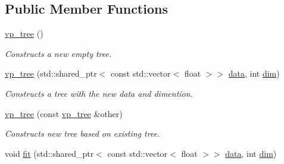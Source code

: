 \subsection*{Public Member Functions}
\begin{DoxyCompactItemize}
\item 
\hypertarget{classtree_1_1vp__tree_a268b595d9493cf220176cda4f7dccca2}{}\hyperlink{classtree_1_1vp__tree_a268b595d9493cf220176cda4f7dccca2}{vp\+\_\+tree} ()\label{classtree_1_1vp__tree_a268b595d9493cf220176cda4f7dccca2}

\begin{DoxyCompactList}\small\item\em Constructs a new empty tree. \end{DoxyCompactList}\item 
\hypertarget{classtree_1_1vp__tree_a40549e3c3fde384b2cbdb96485301161}{}\hyperlink{classtree_1_1vp__tree_a40549e3c3fde384b2cbdb96485301161}{vp\+\_\+tree} (std\+::shared\+\_\+ptr$<$ const std\+::vector$<$ float $>$$>$ \hyperlink{classtree_1_1vp__tree_a0ac835729832f805cfde6375891f9073}{data}, int \hyperlink{classtree_1_1vp__tree_a9654dfc1b8ec7db0718f3d98a9efe5e1}{dim})\label{classtree_1_1vp__tree_a40549e3c3fde384b2cbdb96485301161}

\begin{DoxyCompactList}\small\item\em Constructs a tree with the new data and dimention. \end{DoxyCompactList}\item 
\hypertarget{classtree_1_1vp__tree_a98910f15d4574987845e36962bb64f03}{}\hyperlink{classtree_1_1vp__tree_a98910f15d4574987845e36962bb64f03}{vp\+\_\+tree} (const \hyperlink{classtree_1_1vp__tree}{vp\+\_\+tree} \&other)\label{classtree_1_1vp__tree_a98910f15d4574987845e36962bb64f03}

\begin{DoxyCompactList}\small\item\em Constructs new tree based on existing tree. \end{DoxyCompactList}\item 
\hypertarget{classtree_1_1vp__tree_ad903e1af5405b518a4775c3874dd3d37}{}void \hyperlink{classtree_1_1vp__tree_ad903e1af5405b518a4775c3874dd3d37}{fit} (std\+::shared\+\_\+ptr$<$ const std\+::vector$<$ float $>$$>$ \hyperlink{classtree_1_1vp__tree_a0ac835729832f805cfde6375891f9073}{data}, int \hyperlink{classtree_1_1vp__tree_a9654dfc1b8ec7db0718f3d98a9efe5e1}{dim})\label{classtree_1_1vp__tree_ad903e1af5405b518a4775c3874dd3d37}


\end{DoxyCompactItemize}

